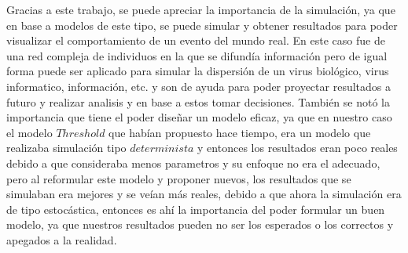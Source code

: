 \documentclass{article}
\begin{document}
	Gracias a este trabajo, se puede apreciar la importancia de la simulación, ya que en base a modelos de este tipo, se puede simular y obtener resultados para poder visualizar el comportamiento de un evento del mundo real. En este caso fue de una red compleja de individuos en la que se difundía información pero de igual forma puede ser aplicado para simular la dispersión de un virus biológico, virus informatico, información, etc. y son de ayuda para poder proyectar resultados a futuro y realizar analisis y en base a estos tomar decisiones. También se notó la importancia que tiene el poder diseñar un modelo eficaz, ya que en nuestro caso el modelo $Threshold$ que habían propuesto hace tiempo, era un modelo que realizaba simulación tipo $determinista$ y entonces los resultados eran poco reales debido a que consideraba menos parametros y su enfoque no era el adecuado, pero al reformular este modelo y proponer nuevos, los resultados que se simulaban era mejores y se veían más reales, debido a que ahora la simulación era de tipo estocástica, entonces es ahí la importancia del poder formular un buen modelo, ya que nuestros resultados pueden no ser los esperados o los correctos y apegados a la realidad.
	 
\newpage

\printbibliography
\end{document}
